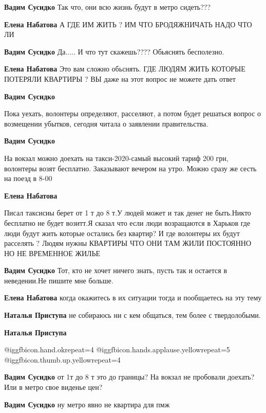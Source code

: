 \begin{itemize}
\begin{itemize}
\textbf{Вадим Сусидко} Так что, они всю жизнь будут в метро сидеть???

\textbf{Елена Набатова} А ГДЕ ИМ ЖИТЬ ? ИМ ЧТО БРОДЯЖНИЧАТЬ НАДО ЧТО ЛИ

\textbf{Вадим Сусидко} Да..... И что тут скажешь???? Обьяснять бесполезно.

\textbf{Елена Набатова} Это вам сложно обьснять. ГДЕ ЛЮДЯМ ЖИТЬ КОТОРЫЕ ПОТЕРЯЛИ КВАРТИРЫ ? ВЫ даже на этот вопрос не можете дать ответ

\textbf{Вадим Сусидко} 

Пока уехать, волонтеры определяют, расселяют, а потом будет решаться вопрос о
возмещении убытков, сегодня читала о заявлении правительства.

\textbf{Вадим Сусидко} 

На вокзал можно доехать на такси-2020-самый высокий тариф 200 грн, волонтеры
возят бесплатно. Заказывают вечером на утро. Можно сразу же сесть на поезд в 8-00

\textbf{Елена Набатова} 

Писал таксисиы берет от 1 т до 8 т.У людей может и так денег не быть.Никто
бесплатно не будет возитт.Я сказал что если люди возращаются в Харьков где люди
будут жить которые остались без квартир? И где волонтеры их будут расселять ?
Людям нужны КВАРТИРЫ ЧТО ОНИ ТАМ ЖИЛИ ПОСТОЯННО НО НЕ ВРЕМЕННОЕ ЖИЛЬЕ

\textbf{Вадим Сусидко} Тот, кто не хочет ничего знать, пусть так и остается в неведении.Не пишите мне больше.

\textbf{Елена Набатова} когда окажитесь в их ситуации тогда и пообщаетесь на эту тему

\textbf{Наталья Приступа} не собираюсь ни с кем общаться, тем более с твердолобыми.

\textbf{Наталья Приступа}  

@igg{fbicon.hand.ok}{repeat=4}  @igg{fbicon.hands.applause.yellow}{repeat=5}
@igg{fbicon.thumb.up.yellow}{repeat=4} 

\textbf{Вадим Сусидко} от 1т до 8 т это до границы? На вокзал не пробовали доехать? Или в метро свое виденье цен?

\textbf{Вадим Сусидко} ну метро явно не квартира для пмж


\end{itemize}
\end{itemize}
